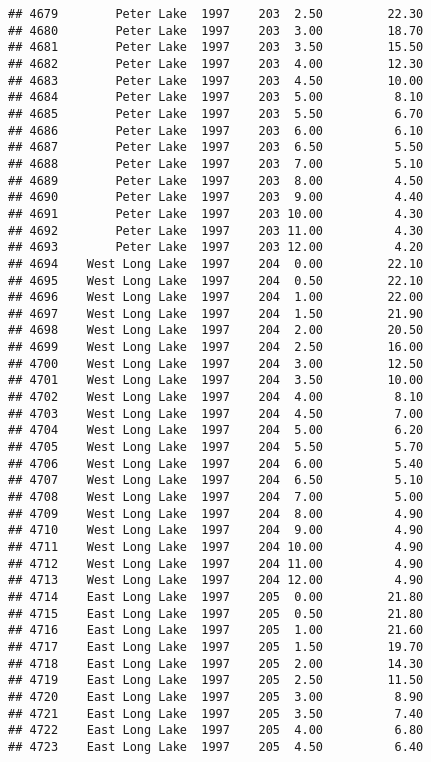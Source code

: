 \documentclass[
]{article}
\begin{document}
\begin{verbatim}
## 4679        Peter Lake  1997    203  2.50         22.30
## 4680        Peter Lake  1997    203  3.00         18.70
## 4681        Peter Lake  1997    203  3.50         15.50
## 4682        Peter Lake  1997    203  4.00         12.30
## 4683        Peter Lake  1997    203  4.50         10.00
## 4684        Peter Lake  1997    203  5.00          8.10
## 4685        Peter Lake  1997    203  5.50          6.70
## 4686        Peter Lake  1997    203  6.00          6.10
## 4687        Peter Lake  1997    203  6.50          5.50
## 4688        Peter Lake  1997    203  7.00          5.10
## 4689        Peter Lake  1997    203  8.00          4.50
## 4690        Peter Lake  1997    203  9.00          4.40
## 4691        Peter Lake  1997    203 10.00          4.30
## 4692        Peter Lake  1997    203 11.00          4.30
## 4693        Peter Lake  1997    203 12.00          4.20
## 4694    West Long Lake  1997    204  0.00         22.10
## 4695    West Long Lake  1997    204  0.50         22.10
## 4696    West Long Lake  1997    204  1.00         22.00
## 4697    West Long Lake  1997    204  1.50         21.90
## 4698    West Long Lake  1997    204  2.00         20.50
## 4699    West Long Lake  1997    204  2.50         16.00
## 4700    West Long Lake  1997    204  3.00         12.50
## 4701    West Long Lake  1997    204  3.50         10.00
## 4702    West Long Lake  1997    204  4.00          8.10
## 4703    West Long Lake  1997    204  4.50          7.00
## 4704    West Long Lake  1997    204  5.00          6.20
## 4705    West Long Lake  1997    204  5.50          5.70
## 4706    West Long Lake  1997    204  6.00          5.40
## 4707    West Long Lake  1997    204  6.50          5.10
## 4708    West Long Lake  1997    204  7.00          5.00
## 4709    West Long Lake  1997    204  8.00          4.90
## 4710    West Long Lake  1997    204  9.00          4.90
## 4711    West Long Lake  1997    204 10.00          4.90
## 4712    West Long Lake  1997    204 11.00          4.90
## 4713    West Long Lake  1997    204 12.00          4.90
## 4714    East Long Lake  1997    205  0.00         21.80
## 4715    East Long Lake  1997    205  0.50         21.80
## 4716    East Long Lake  1997    205  1.00         21.60
## 4717    East Long Lake  1997    205  1.50         19.70
## 4718    East Long Lake  1997    205  2.00         14.30
## 4719    East Long Lake  1997    205  2.50         11.50
## 4720    East Long Lake  1997    205  3.00          8.90
## 4721    East Long Lake  1997    205  3.50          7.40
## 4722    East Long Lake  1997    205  4.00          6.80
## 4723    East Long Lake  1997    205  4.50          6.40

\end{verbatim}
\end{document}
